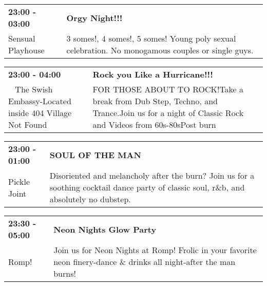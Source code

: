 \begin{tabular}{ p{1in} p{2.2in} }
    \textbf{23:00 - 03:00} & \textbf{Orgy Night!!!} \\
    Sensual Playhouse \newline  & 3 somes!, 4 somes!, 5 somes! Young poly sexual celebration. No monogamous couples or single guys. \\
    \hline 
\end{tabular}
    
\begin{tabular}{ p{1in} p{2.2in} }
    \textbf{23:00 - 04:00} & \textbf{Rock you Like a Hurricane!!!} \\
    ~ \newline The Swish Embassy-Located inside 404 Village Not Found & FOR THOSE ABOUT TO ROCK!Take a break from Dub Step, Techno, and Trance.Join us for a night of Classic Rock and Videos from 60s-80sPost burn \\
    \hline 
\end{tabular}
    
\begin{tabular}{ p{1in} p{2.2in} }
    \textbf{23:00 - 01:00} & \textbf{SOUL OF THE MAN} \\
    Pickle Joint \newline  & Disoriented and melancholy after the burn? Join us for a soothing cocktail dance party of classic soul, r\&b, and absolutely no dubstep. \\
    \hline 
\end{tabular}
    
\begin{tabular}{ p{1in} p{2.2in} }
    \textbf{23:30 - 05:00} & \textbf{Neon Nights Glow Party} \\
    Romp! \newline  & Join us for Neon Nights at Romp! Frolic in your favorite neon finery-dance \& drinks all night-after the man burns! \\
    \hline 
\end{tabular}
    
